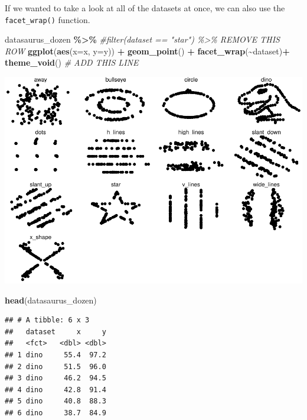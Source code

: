 \documentclass[
]{book}
\newenvironment{Shaded}{\begin{snugshade}}{\end{snugshade}}
\newcommand{\AttributeTok}[1]{\textcolor[rgb]{0.13,0.29,0.53}{#1}}
\newcommand{\CommentTok}[1]{\textcolor[rgb]{0.56,0.35,0.01}{\textit{#1}}}
\newcommand{\FunctionTok}[1]{\textcolor[rgb]{0.13,0.29,0.53}{\textbf{#1}}}
\newcommand{\NormalTok}[1]{#1}
\newcommand{\SpecialCharTok}[1]{\textcolor[rgb]{0.81,0.36,0.00}{\textbf{#1}}}
\begin{document}
If we wanted to take a look at all of the datasets at once, we can also use the \texttt{facet\_wrap()} function.

\begin{Shaded}
\begin{Highlighting}[]
\NormalTok{datasaurus\_dozen }\SpecialCharTok{\%\textgreater{}\%} 
  \CommentTok{\#filter(dataset == "star") \%\textgreater{}\%  REMOVE THIS ROW}
  \FunctionTok{ggplot}\NormalTok{(}\FunctionTok{aes}\NormalTok{(}\AttributeTok{x=}\NormalTok{x, }\AttributeTok{y=}\NormalTok{y)) }\SpecialCharTok{+} 
  \FunctionTok{geom\_point}\NormalTok{() }\SpecialCharTok{+} 
  \FunctionTok{facet\_wrap}\NormalTok{(}\SpecialCharTok{\textasciitilde{}}\NormalTok{dataset)}\SpecialCharTok{+} \FunctionTok{theme\_void}\NormalTok{() }\CommentTok{\# ADD THIS LINE}
\end{Highlighting}
\end{Shaded}

\includegraphics{_main_files/figure-latex/unnamed-chunk-69-1.pdf}

\begin{Shaded}
\begin{Highlighting}[]
\FunctionTok{head}\NormalTok{(datasaurus\_dozen)}
\end{Highlighting}
\end{Shaded}

\begin{verbatim}
## # A tibble: 6 x 3
##   dataset     x     y
##   <fct>   <dbl> <dbl>
## 1 dino     55.4  97.2
## 2 dino     51.5  96.0
## 3 dino     46.2  94.5
## 4 dino     42.8  91.4
## 5 dino     40.8  88.3
## 6 dino     38.7  84.9
\end{verbatim}
\end{document}
